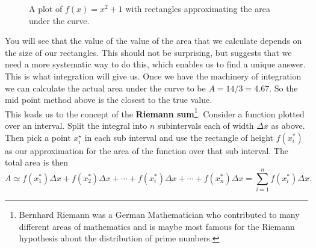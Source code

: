 \begin{figure}[ht]
    \centering
{}
    \caption{A plot of  $f(x)=x^{2}+1$ with rectangles approximating the area under the curve.}
        \label{fig: approximate area mid}
\end{figure}

You will see that the value of the value of the area that we calculate depends on the size of our rectangles. This should not be surprising, but suggests that we need a more systematic way to do this, which enables us to find a unique answer. This is what integration will give us. Once we have the machinery of integration we can calculate the actual area under the curve to be $A=14/3=4.67$. So the mid point method above is the closest to the true value.\\

This leads us to the concept of the \textbf{Riemann sum}\footnote{Bernhard Riemann was a German Mathematician who contributed to many different areas of mathematics and is maybe most famous for the Riemann hypothesis about the distribution of prime numbers.}.  Consider a function plotted over an interval. Split the integral into $n$ subintervals each of width $\Delta x$ as above. Then pick a point $x_{i}^{\star}$ in each sub interval and use the rectangle of height $f(x_{i}^{*})$ as our approximation for the area of the function over that sub interval. The total area is then
\begin{equation}
A\simeq f(x_{1}^{*})\Delta x+f(x_{2}^{*})\Delta x +\cdots + f(x_{i}^{*})\Delta x+\cdots +f(x_{n}^{*})\Delta x=\sum_{i=1}^{n} f(x_{i}^{*})\Delta x.
\end{equation}

